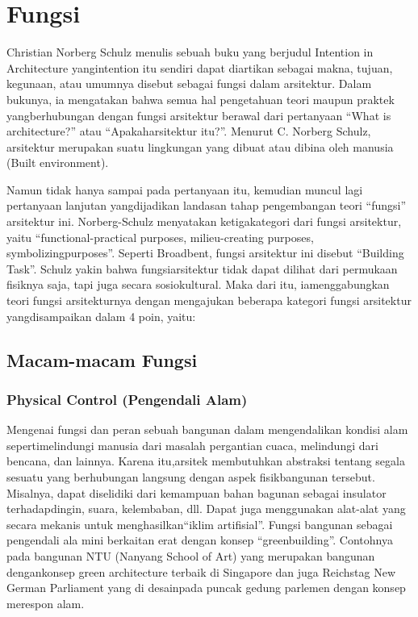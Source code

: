 \documentclass[../manperil.tex]{subfiles}
\begin{document}
\section{Fungsi}

Christian Norberg Schulz menulis sebuah buku yang berjudul Intention in Architecture yangintention itu sendiri dapat diartikan sebagai makna, tujuan, kegunaan, atau umumnya disebut sebagai fungsi dalam arsitektur. Dalam bukunya, ia mengatakan bahwa semua hal pengetahuan teori maupun praktek yangberhubungan dengan fungsi arsitektur berawal dari pertanyaan “What is architecture?” atau “Apakaharsitektur itu?”. Menurut C. Norberg Schulz, arsitektur merupakan suatu lingkungan yang dibuat atau dibina oleh manusia (Built environment).

Namun tidak hanya sampai pada pertanyaan itu, kemudian muncul lagi pertanyaan lanjutan yangdijadikan landasan tahap pengembangan teori “fungsi” arsitektur ini. Norberg-Schulz menyatakan ketigakategori dari fungsi arsitektur, yaitu “functional-practical purposes, milieu-creating purposes, symbolizingpurposes”. Seperti Broadbent, fungsi arsitektur ini disebut “Building Task”. Schulz yakin bahwa fungsiarsitektur tidak dapat dilihat dari permukaan fisiknya saja, tapi juga secara sosiokultural. Maka dari itu, iamenggabungkan teori fungsi arsitekturnya dengan mengajukan beberapa kategori fungsi arsitektur yangdisampaikan dalam 4 poin, yaitu:

\subsection{Macam-macam Fungsi}%
\label{sub:Macam-macam Fungsi}


\subsubsection{Physical Control (Pengendali Alam)}%
\label{sub:physical_control_(pengendali_alam)}


Mengenai fungsi dan peran sebuah bangunan dalam mengendalikan kondisi alam sepertimelindungi manusia dari masalah pergantian cuaca, melindungi dari bencana, dan lainnya. Karena itu,arsitek membutuhkan abstraksi tentang segala sesuatu yang berhubungan langsung dengan aspek fisikbangunan tersebut. Misalnya, dapat diselidiki dari kemampuan bahan bagunan sebagai insulator terhadapdingin, suara, kelembaban, dll. Dapat juga menggunakan alat-alat yang secara mekanis untuk menghasilkan“iklim artifisial”. Fungsi bangunan sebagai pengendali ala mini berkaitan erat dengan konsep “greenbuilding”. Contohnya pada bangunan NTU (Nanyang School of Art) yang merupakan bangunan dengankonsep green architecture terbaik di Singapore dan juga Reichstag New German Parliament yang di desainpada puncak gedung parlemen dengan konsep merespon alam.
\end{document}
